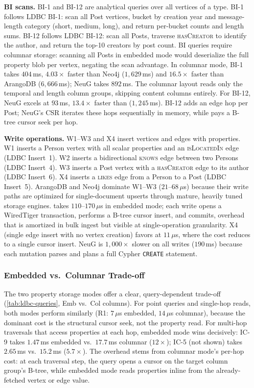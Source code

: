 \textbf{BI scans.}
BI-1 and BI-12 are analytical queries over all vertices of a
type.
BI-1 follows LDBC BI-1: scan all Post vertices, bucket by creation year and
message-length category (short, medium, long), and return per-bucket counts and
length sums.
BI-12 follows LDBC BI-12: scan all Posts, traverse \textsc{hasCreator} to
identify the author, and return the top-10 creators by post count.
%
BI queries require columnar storage: scanning all Posts in embedded mode would deserialize the full property blob per vertex, negating the scan advantage.
In columnar mode, BI-1 takes $404$\,ms, $4.03\times$ faster than Neo4j ($1{,}629$\,ms) and $16.5\times$ faster than ArangoDB ($6{,}666$\,ms); NeuG takes $892$\,ms.
The columnar layout reads only the temporal and length column groups, skipping content columns entirely.
For BI-12, NeuG excels at $93$\,ms, $13.4\times$ faster than \project{} ($1{,}245$\,ms).
BI-12 adds an edge hop per Post; NeuG's CSR iterates these hops sequentially in memory, while \project{} pays a B-tree cursor seek per hop.

\textbf{Write operations.}
W1--W3 and X4 insert vertices and edges with properties.
W1 inserts a Person vertex with all scalar properties and an
\textsc{isLocatedIn} edge (LDBC Insert~1).
W2 inserts a bidirectional \textsc{knows} edge between two Persons (LDBC
Insert~4).
W3 inserts a Post vertex with a \textsc{hasCreator} edge to its author (LDBC
Insert~6).
X4 inserts a \textsc{likes} edge from a Person to a Post (LDBC Insert~5).
%
ArangoDB and Neo4j dominate W1--W3 ($21$--$68$\,$\mu$s) because their write paths are optimized for single-document upserts through mature, heavily tuned storage engines.
\project{} takes $110$--$170$\,$\mu$s in embedded mode; each write opens a WiredTiger transaction, performs a B-tree cursor insert, and commits, overhead that is amortized in bulk ingest but visible at single-operation granularity.
X4 (single edge insert with no vertex creation) favors \project{} at $11$\,$\mu$s, where the cost reduces to a single cursor insert.
NeuG is $1{,}000\times$ slower on all writes ($190$\,ms) because each mutation parses and plans a full Cypher \texttt{CREATE} statement.

\subsubsection{Embedded vs.\ Columnar Trade-off}

The two property storage modes offer a clear, query-dependent trade-off (\autoref{tab:ldbc-queries}, Emb vs.\ Col columns).
For point queries and single-hop reads, both modes perform similarly (R1: $7$\,$\mu$s embedded, $14$\,$\mu$s columnar), because the dominant cost is the structural cursor seek, not the property read.
For multi-hop traversals that access properties at each hop, embedded mode wins decisively: IC-9 takes $1.47$\,ms embedded vs.\ $17.7$\,ms columnar ($12\times$); IC-5 (not shown) takes $2.65$\,ms vs.\ $15.2$\,ms ($5.7\times$).
The overhead stems from columnar mode's per-hop cost: at each traversal step, the query opens a cursor on the target column group's B-tree, while embedded mode reads properties inline from the already-fetched vertex or edge value.


